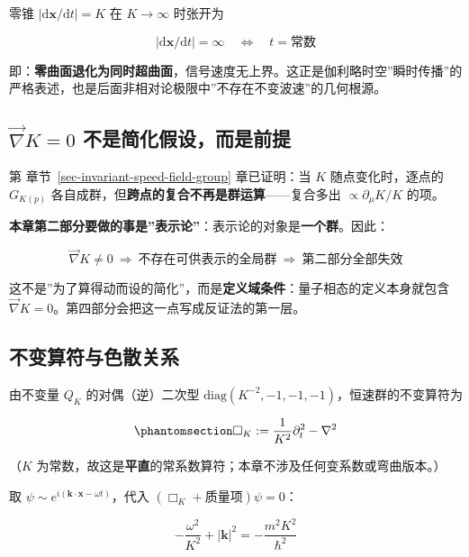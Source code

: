 \documentclass[
  chinese,
  a4paper,
  UTF8,
  12pt,
  oneside,
  openany]{ctexbook}
\theoremstyle{plain}
\theoremstyle{plain}
\theoremstyle{plain}
\theoremstyle{definition}
\theoremstyle{plain}
\theoremstyle{plain}
\theoremstyle{remark}
\begin{document}
零锥 \(\lvert\mathrm{d}\mathbf{x}/\mathrm{d}t\rvert=K\) 在
\(K\to\infty\) 时张开为

\[
\lvert\mathrm{d}\mathbf{x}/\mathrm{d}t\rvert=\infty\quad\Longleftrightarrow\quad t=\text{常数}
\]

即：\textbf{零曲面退化为同时超曲面}，信号速度无上界。这正是伽利略时空''瞬时传播''的严格表述，也是后面非相对论极限中''不存在不变波速''的几何根源。

\subsection{\texorpdfstring{\(\vec\nabla K=0\)
不是简化假设，而是前提}{\textbackslash vec\textbackslash nabla K=0 不是简化假设，而是前提}}\label{vecnabla-k0-ux4e0dux662fux7b80ux5316ux5047ux8bbeux800cux662fux524dux63d0}

第 章节~\ref{sec-invariant-speed-field-group} 章已证明：当 \(K\)
随点变化时，逐点的 \(G_{K(p)}\)
各自成群，但\textbf{跨点的复合不再是群运算}------复合多出
\(\propto\partial_\mu K/K\) 的项。

\textbf{本章第二部分要做的事是''表示论''}：表示论的对象是\textbf{一个群}。因此：

\[
\vec\nabla K\neq0\ \Longrightarrow\ \text{不存在可供表示的全局群}\ \Longrightarrow\ \text{第二部分全部失效}
\]

这不是''为了算得动而设的简化''，而是\textbf{定义域条件}：量子相态的定义本身就包含
\(\vec\nabla K=0\)。第四部分会把这一点写成反证法的第一层。

\subsection{不变算符与色散关系}\label{ux4e0dux53d8ux7b97ux7b26ux4e0eux8272ux6563ux5173ux7cfb}

由不变量 \(Q_K\) 的对偶（逆）二次型
\(\mathrm{diag}(K^{-2},-1,-1,-1)\)，恒速群的不变算符为

\begin{equation}\protect\phantomsection\label{eq-qp-box}{
\Box_K:=\frac{1}{K^{2}}\partial_t^{2}-\nabla^{2}
}\end{equation}

（\(K\)
为常数，故这是\textbf{平直}的常系数算符；本章不涉及任何变系数或弯曲版本。）

取 \(\psi\sim e^{i(\mathbf{k}\cdot\mathbf{x}-\omega t)}\)，代入
\((\Box_K+\text{质量项})\psi=0\)：

\[
-\frac{\omega^{2}}{K^{2}}+\lvert\mathbf{k}\rvert^{2}=-\frac{m^{2}K^{2}}{\hbar^{2}}
\]
\end{document}

